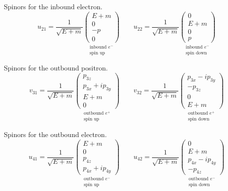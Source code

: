Spinors for the inbound electron.
\begin{equation*}
u_{21}=\frac{1}{\sqrt{E+m}}
\underset{\substack{\text{inbound $e^-$}\\\text{spin up}}}
{\begin{pmatrix}E+m\\0\\-p\\0\end{pmatrix}}
\qquad
u_{22}=\frac{1}{\sqrt{E+m}}
\underset{\substack{\text{inbound $e^-$}\\\text{spin down}}}
{\begin{pmatrix}0\\E+m\\0\\p\end{pmatrix}}
\end{equation*}

Spinors for the outbound positron.
\begin{equation*}
v_{31}=\frac{1}{\sqrt{E+m}}
\underset{\substack{\text{outbound $e^+$}\\\text{spin up}}}
{\begin{pmatrix}p_{3z}\\p_{3x}+ip_{3y}\\E+m\\0\end{pmatrix}}
\qquad
v_{32}=\frac{1}{\sqrt{E+m}}
\underset{\substack{\text{outbound $e^+$}\\\text{spin down}}}
{\begin{pmatrix}p_{3x}-ip_{3y}\\-p_{3z}\\0\\E+m\end{pmatrix}}
\end{equation*}

Spinors for the outbound electron.
\begin{equation*}
u_{41}=\frac{1}{\sqrt{E+m}}
\underset{\substack{\text{outbound $e^-$}\\\text{spin up}}}
{\begin{pmatrix}E+m\\0\\p_{4z}\\p_{4x}+ip_{4y}\end{pmatrix}}
\qquad
u_{42}=\frac{1}{\sqrt{E+m}}
\underset{\substack{\text{outbound $e^-$}\\\text{spin down}}}
{\begin{pmatrix}0\\E+m\\p_{4x}-ip_{4y}\\-p_{4z}\end{pmatrix}}
\end{equation*}

